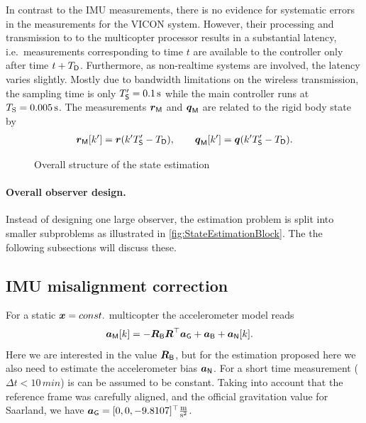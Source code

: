 In contrast to the IMU measurements, there is no evidence for systematic errors in the measurements for the VICON system.
However, their processing and transmission to to the multicopter processor results in a substantial latency, i.e.\ measurements corresponding to time $t$ are available to the controller only after time $t+T_{\mathsf{D}}$.
Furthermore, as non-realtime systems are involved, the latency varies slightly.
Mostly due to bandwidth limitations on the wireless transmission, the sampling time is only $T'_{\mathsf{S}}=0.1\,\text{s}$ while the main controller runs at $T_{\mathrm{S}}=0.005\,\text{s}$.
The measurements $\boldsymbol{r}_{\mathsf{M}}$ and $\boldsymbol{q}_{\mathsf{M}}$ are related to the rigid body state by
\begin{align}
 \boldsymbol{r}_{\mathsf{M}}[k'] = \boldsymbol{r}(k'T'_{\mathsf{S}} - T_{\mathsf{D}}),
\qquad
 \boldsymbol{q}_{\mathsf{M}}[k'] = \boldsymbol{q}(k'T'_{\mathsf{S}} - T_{\mathsf{D}}).
\end{align}

\begin{figure}
 \centering
 
 \caption{Overall structure of the state estimation}
 \label{fig:StateEstimationBlock}
\end{figure}

\paragraph{Overall observer design.}
Instead of designing one large observer, the estimation problem is split into smaller subproblems as illustrated in \autoref{fig:StateEstimationBlock}.
The the following subsections will discuss these.




\subsection{IMU misalignment correction}
For a static $\boldsymbol{x}=const.$ multicopter the accelerometer model reads
\begin{align}
 \boldsymbol{a}_{\mathsf{M}}[k] &=  -\boldsymbol{R}_{\mathsf{B}} \boldsymbol{R}^\top \boldsymbol{a}_{\mathsf{G}} + \boldsymbol{a}_{\mathsf{B}} + \boldsymbol{a}_{\mathsf{N}}[k].
\end{align} 
Here we are interested in the value $\boldsymbol{R}_{\mathsf{B}}$, but for the estimation proposed here we also need to estimate the accelerometer bias $\boldsymbol{a}_{\mathsf{N}}$.
For a short time measurement ($\Delta t<10\,\unit{min}$) is can be assumed to be constant.
Taking into account that the reference frame was carefully aligned, and the official gravitation value for Saarland, we have $\boldsymbol{a}_{\mathsf{G}} = [0, 0, -9.8107]^\top \tfrac{\text{m}}{\text{s}^2}$.

